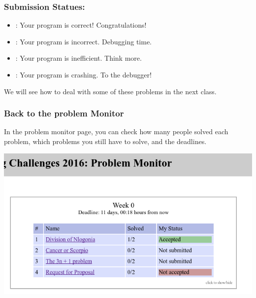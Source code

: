 \documentclass{beamer}
\begin{document}
\begin{frame}
  \frametitle{Submission Statues:}
  \begin{itemize}
  \item {}: Your program is correct!
    Congratulations!
  \item {}: Your program is incorrect. Debugging
    time.
  \item {}: Your program is
    inefficient. Think more.
  \item {}: Your program is crashing. To the
    debugger!
  \end{itemize}

  \bigskip

  We will see how to deal with some of these problems in the next class.
\end{frame}

\begin{frame}
  \frametitle{Back to the problem Monitor}

  In the problem monitor page, you can check how many people solved
  each problem, which problems you still have to solve, and the
  deadlines.

  \begin{center}
    \includegraphics[width=.7\textwidth]{../img/monitorpage2}
  \end{center}
\end{frame}
\end{document}
